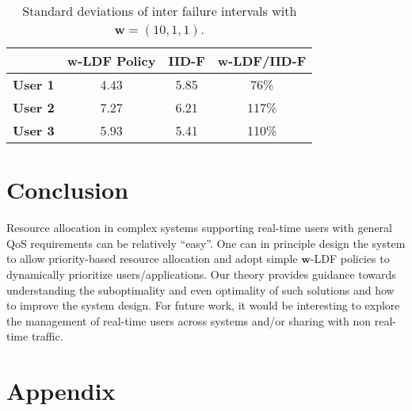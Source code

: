 \documentclass[prodmode,acmtompecs]{acmsmall}
\newcommand{\myComments}[1]{}
\newif\ifhuawei
\newcommand{\huaweiStart}{\ifhuawei  \myComments{Huawei version: }}
\newcommand{\commentEnd}{\myComments{End}}
\begin{document}
\begin{table}[h]
\normalsize
    \centering
    \begin{tabular}{| c | c | c | c |}
    \hline
    ~ & {\bf $\mathbf{w}$-LDF Policy} & {\bf IID-F} & {\bf $\mathbf{w}$-LDF/IID-F}\\
    \hline
    {\bf User 1} & 4.43 & 5.85 & 76\%	\\
    \hline
    {\bf User 2} & 7.27 & 6.21 & 117\%	\\
    \hline
    {\bf User 3} & 5.93 & 5.41 & 110\%	\\
    \hline
    \end{tabular}
    \caption{Standard deviations of inter failure intervals with $\mathbf{w} = (10,1,1)$. }
    \label{tab_sd_ifi_different_weights}
\end{table}
\commentEnd\fi


\section{Conclusion}
Resource allocation in complex systems supporting real-time users with general QoS requirements can be relatively ``easy''. One can in principle design the system to allow priority-based resource allocation and adopt simple $\mathbf{w}$-LDF policies to dynamically prioritize users/applications. 
Our theory provides guidance towards understanding the suboptimality and even optimality of such solutions and how to improve the system design. 
For future work, it would be interesting to explore the management of real-time users across systems and/or sharing with non real-time traffic. 





\huaweiStart
\section*{Acknowledgment}
This research was supported by Huawei Technologies Co. Ltd. 
The authors would like to thank Alan Gatherer, Zheng Lu, Haishan Zhu and Mattan Erez for their comments and feedbacks on this work. 
\commentEnd\fi

{}


\section{Appendix}
\end{document}
